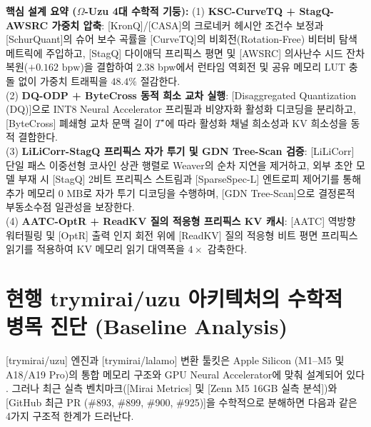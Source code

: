 \documentclass[10pt,a4paper]{article}
\newcommand{\takeaway}[2]{%
  \vspace{4pt}\noindent\colorbox{primary!8}{%
    \parbox{\dimexpr\textwidth-2\fboxsep\relax}{%
      \vspace{3pt}\textbf{\color{primary}#1:}\hspace{0.5em}#2\vspace{3pt}%
    }%
  }\vspace{4pt}%
}
\begin{document}
\takeaway{핵심 설계 요약 ($\Omega$-Uzu 4대 수학적 기둥)}{%
(1) \textbf{KSC-CurveTQ + StagQ-AWSRC 가중치 압축}: [KronQ]/[CASA]의 크로네커 헤시안 조건수 보정과 [SchurQuant]의 슈어 보수 곡률을 [CurveTQ]의 비회전(Rotation-Free) 비터비 탐색 메트릭에 주입하고, [StagQ] 다이애딕 프리픽스 평면 및 [AWSRC] 의사난수 시드 잔차 복원($+0.162\text{ bpw}$)을 결합하여 2.38 bpw에서 런타임 역회전 및 공유 메모리 LUT 충돌 없이 가중치 트래픽을 $48.4\%$ 절감한다. \\
(2) \textbf{DQ-ODP + ByteCross 동적 희소 교차 실행}: [Disaggregated Quantization (DQ)]으로 INT8 Neural Accelerator 프리필과 비양자화 활성화 디코딩을 분리하고, [ByteCross] 폐쇄형 교차 문맥 길이 $T^\star$에 따라 활성화 채널 희소성과 KV 희소성을 동적 결합한다. \\
(3) \textbf{LiLiCorr-StagQ 프리픽스 자가 투기 및 GDN Tree-Scan 검증}: [LiLiCorr] 단일 패스 이중선형 코사인 상관 행렬로 \textsf{Weaver}의 순차 지연을 제거하고, 외부 초안 모델 부재 시 [StagQ] 2비트 프리픽스 스트림과 [SparseSpec-L] 엔트로피 제어기를 통해 추가 메모리 $0\text{ MB}$로 자가 투기 디코딩을 수행하며, [GDN Tree-Scan]으로 결정론적 부동소수점 일관성을 보장한다. \\
(4) \textbf{AATC-OptR + ReadKV 질의 적응형 프리픽스 KV 캐시}: [AATC] 역방향 워터필링 및 [OptR] 출력 인지 회전 위에 [ReadKV] 질의 적응형 비트 평면 프리픽스 읽기를 적용하여 KV 메모리 읽기 대역폭을 $4\times$ 감축한다.%
}

\section{현행 \textsf{trymirai/uzu} 아키텍처의 수학적 병목 진단 (Baseline Analysis)}

[\textsf{trymirai/uzu}] 엔진과 [\textsf{trymirai/lalamo}] 변환 툴킷은 Apple Silicon (M1--M5 및 A18/A19 Pro)의 통합 메모리 구조와 GPU Neural Accelerator에 맞춰 설계되어 있다 \cite{mirai2026quant,mirai2026specdec}. 그러나 최근 실측 벤치마크([Mirai Metrics] 및 [Zenn M5 16GB 실측 분석])와 [GitHub 최근 PR (\#893, \#899, \#900, \#925)]을 수학적으로 분해하면 다음과 같은 4가지 구조적 한계가 드러난다.
\end{document}
